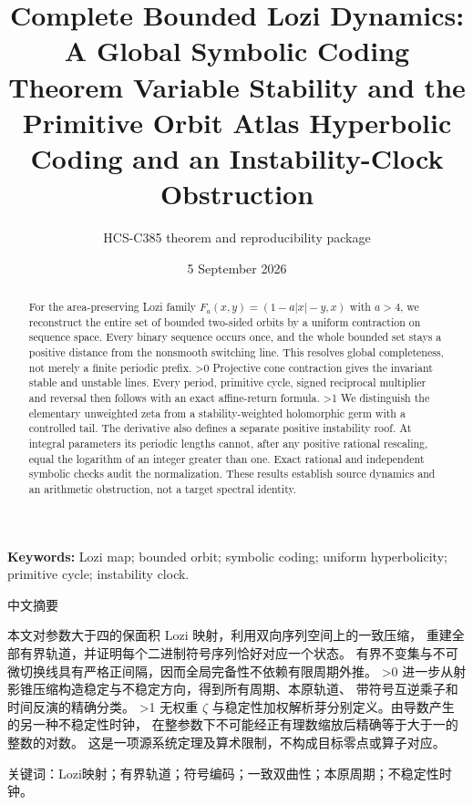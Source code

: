 \documentclass[10pt]{article}
\title{Complete Bounded Lozi Dynamics:\\
\ifcase\CRevisionRound
A Global Symbolic Coding Theorem
\or
Variable Stability and the Primitive Orbit Atlas
\else
Hyperbolic Coding and an Instability-Clock Obstruction
\fi}
\author{HCS-C385 theorem and reproducibility package}
\date{5 September 2026}
\begin{document}
\maketitle
\begin{abstract}
For the area-preserving Lozi family
$F_a(x,y)=(1-a|x|-y,x)$ with $a>4$, we reconstruct the entire set of
bounded two-sided orbits by a uniform contraction on sequence space.
Every binary sequence occurs once, and the whole bounded set stays a
positive distance from the nonsmooth switching line. This resolves
global completeness, not merely a finite periodic prefix.
\ifnum\CRevisionRound>0
Projective cone contraction gives the invariant stable and unstable lines.
Every period, primitive cycle, signed reciprocal multiplier and reversal
then follows with an exact affine-return formula.
\fi
\ifnum\CRevisionRound>1
We distinguish the elementary unweighted zeta from a stability-weighted
holomorphic germ with a controlled tail. The derivative also defines a
separate positive instability roof. At integral parameters its periodic
lengths cannot, after any positive rational rescaling, equal the logarithm
of an integer greater than one. Exact rational and independent symbolic
checks audit the normalization. These results establish source dynamics
and an arithmetic obstruction, not a target spectral identity.
\fi
\end{abstract}
\noindent\textbf{Keywords:} Lozi map; bounded orbit; symbolic coding;
uniform hyperbolicity; primitive cycle; instability clock.
\begin{otherlanguage}{chinese-simplified}
\begin{center}{\large 中文摘要}\end{center}
\begin{sloppypar}
本文对参数大于四的保面积 \foreignlanguage{english}{Lozi} 映射，利用双向序列空间上的一致压缩，
重建全部有界轨道，并证明每个二进制符号序列恰好对应一个状态。
有界不变集与不可微切换线具有严格正间隔，因而全局完备性不依赖有限周期外推。
\ifnum\CRevisionRound>0
进一步从射影锥压缩构造稳定与不稳定方向，得到所有周期、本原轨道、
带符号互逆乘子和时间反演的精确分类。
\fi
\ifnum\CRevisionRound>1
无权重 $\zeta$ 与稳定性加权解析芽分别定义。由导数产生的另一种不稳定性时钟，
在整参数下不可能经正有理数缩放后精确等于大于一的整数的对数。
这是一项源系统定理及算术限制，不构成目标零点或算子对应。
\fi
\end{sloppypar}
\noindent 关键词：\foreignlanguage{english}{Lozi}映射；有界轨道；符号编码；一致双曲性；本原周期；不稳定性时钟。
\end{otherlanguage}
\end{document}
